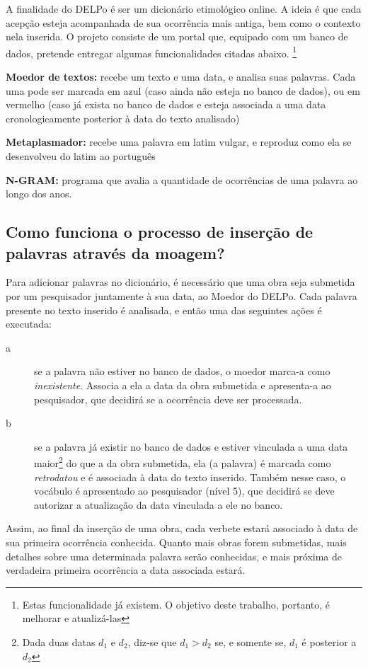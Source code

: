 A finalidade do DELPo é ser um dicionário etimológico online. A ideia é que cada acepção
esteja acompanhada de sua ocorrência mais antiga, bem como o contexto nela inserida. O
projeto consiste de um portal que, equipado com um banco de dados, pretende entregar algumas
funcionalidades citadas abaixo. \footnote{Estas funcionalidade já existem. O objetivo deste
trabalho, portanto, é melhorar e atualizá-las}

\textbf{Moedor de textos:} recebe um texto e uma data, e analisa suas palavras. Cada uma pode
ser marcada em azul (caso ainda não esteja no banco de dados), ou em vermelho (caso já exista
no banco de dados e esteja associada a uma data cronologicamente posterior à data do texto
analisado)

\textbf{Metaplasmador:} recebe uma palavra em latim vulgar, e reproduz como ela se desenvolveu
do latim ao português

\textbf{N-GRAM:} programa que avalia a quantidade de ocorrências de uma palavra ao longo dos
anos.

\subsection{Como funciona o processo de inserção de palavras através da moagem?}
\label{subsec:moagem}

Para adicionar palavras no dicionário, é necessário que uma obra seja submetida
por um pesquisador juntamente à sua data, ao Moedor do DELPo. Cada palavra presente
no texto inserido é analisada, e então uma das seguintes ações é executada:
\begin{description}
    \item[a]  se a palavra não estiver no banco de dados, o moedor marca-a como
    \emph{inexistente}. Associa a ela a data da obra submetida e apresenta-a ao
    pesquisador, que decidirá se a ocorrência deve ser processada.
    \item[b] se a palavra já existir no banco de dados e estiver vinculada a uma
    data maior\footnote{Dada duas datas $d_1$ e $d_2$, diz-se que $d_1 > d_2$ se,
    e somente se, $d_1$ é posterior a $d_2$} do que a da obra submetida, ela (a
    palavra) é marcada como \emph{retrodatou} e é associada à data do texto
    inserido. Também nesse caso, o vocábulo é apresentado ao pesquisador (nível
    5), que decidirá se deve autorizar a atualização da data vinculada a ele no banco.
\end{description}

Assim, ao final da inserção de uma obra, cada verbete estará associado à data de
sua primeira ocorrência conhecida. Quanto mais obras forem submetidas, mais detalhes
sobre uma determinada palavra serão conhecidas, e mais próxima de verdadeira
primeira ocorrência a data associada estará.

